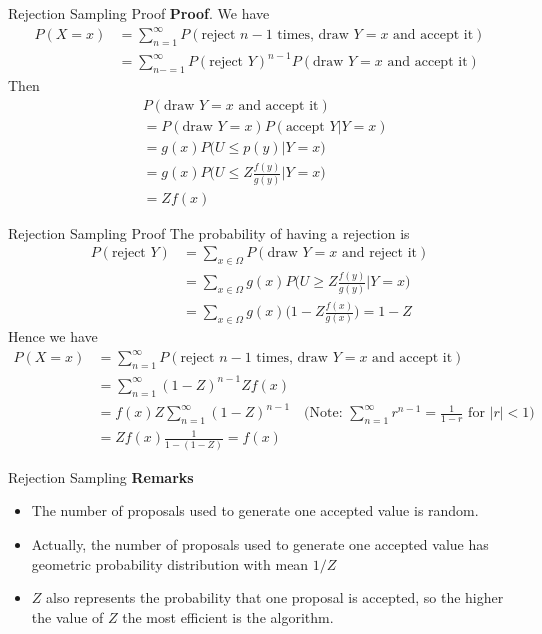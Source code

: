 \documentclass[8pt]{beamer}
\begin{document}
\begin{frame}{Rejection Sampling Proof}
\textbf{Proof}.
We have
\begin{align*}
P(X = x) &= \sum_{n=1}^{\infty} P(\text{reject $n-1$ times, draw $Y = x$ and accept it})\\
&= \sum_{n-=1}^{\infty}P(\text{reject $Y$})^{n-1}P(\text{draw $Y = x$ and accept it})
\end{align*}
Then
\begin{align*}
& P(\text{draw $Y = x$ and accept it})\\
&= P(\text{draw $Y = x$})P(\text{accept $Y|Y=x$})\\
&= g(x)P\biggl(U \leq p(y)| Y = x \biggl) \\
&= g(x)P\biggl(U \leq Z\frac{f(y)}{g(y)} \biggl| Y = x \biggl)\\
&= Zf(x)
\end{align*}
\end{frame}

\begin{frame}{Rejection Sampling Proof}
The probability of having a rejection is 
\begin{align*}
P(\text{reject $Y$}) 
&= \sum_{x\in\Omega} P(\text{draw $Y = x$ and reject it}) \\
&= \sum_{x\in\Omega} g(x)P\biggl(U \geq Z\frac{f(y)}{g(y)} \biggl| Y = x \biggl)\\
&= \sum_{x\in\Omega} g(x) \biggl(1 - Z\frac{f(x)}{g(x)} \biggl) = 1- Z
\end{align*}
Hence we have 
\begin{align*}
P(X = x) 
&= \sum_{n=1}^{\infty} P(\text{reject $n-1$ times, draw $Y = x$ and accept it})\\
&= \sum_{n=1}^{\infty}(1-Z)^{n-1}Zf(x)\\
&= f(x)Z \sum_{n=1}^{\infty}(1-Z)^{n-1} \quad \biggl(\text{Note: $\sum_{n=1}^{\infty}r^{n-1} = \frac{1}{1-r}$ for $|r| < 1$}\biggl)\\
&= Zf(x)\frac{1}{1-(1-Z)} = f(x)
\end{align*}
\end{frame}

\begin{frame}{Rejection Sampling}
\textbf{Remarks}

\begin{itemize}
	\item The number of proposals used to generate one accepted value is random.
	\item Actually, the number of proposals used to generate one accepted value has geometric probability distribution with mean $1/Z$
	\item $Z$ also represents the probability that one proposal is accepted, so the higher the value of $Z$ the most efficient is the algorithm.
\end{itemize}
\end{frame}
\end{document}
